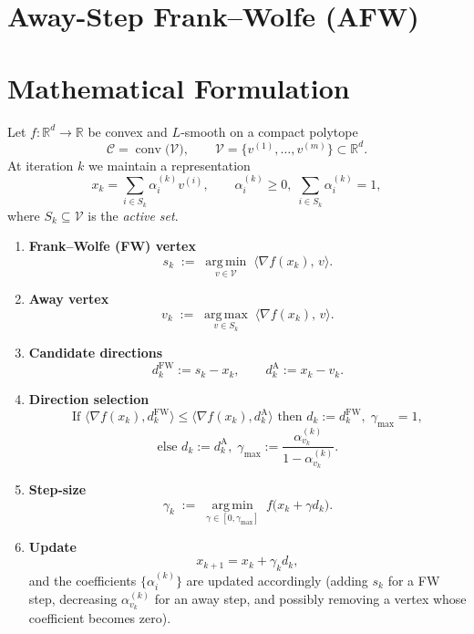 \documentclass{article}
\newcommand{\argmin}{\operatorname*{arg\,min}}
\newcommand{\argmax}{\operatorname*{arg\,max}}
\begin{document}
\section*{Away-Step Frank–Wolfe (AFW)}

\section*{Mathematical Formulation}
Let $f:\mathbb{R}^d\rightarrow\mathbb{R}$ be convex and $L$‑smooth on a compact polytope 
\[
\mathcal C=\operatorname{conv}\bigl(\mathcal V\bigr),\qquad 
\mathcal V=\{v^{(1)},\dots ,v^{(m)}\}\subset\mathbb R^{d}.
\]
At iteration $k$ we maintain a representation 
\[
x_k=\sum_{i\in S_k}\alpha_i^{(k)} v^{(i)},\qquad 
\alpha_i^{(k)}\ge 0,\;\sum_{i\in S_k}\alpha_i^{(k)}=1,
\]
where $S_k\subseteq \mathcal V$ is the \emph{active set}.  

\begin{enumerate}
\item \textbf{Frank–Wolfe (FW) vertex}
\[
s_k\;:=\;\argmin_{v\in\mathcal V}\;\langle\nabla f(x_k),\,v\rangle .
\]
\item \textbf{Away vertex}
\[
v_k\;:=\;\argmax_{v\in S_k}\;\langle\nabla f(x_k),\,v\rangle .
\]
\item \textbf{Candidate directions}
\[
d^{\mathrm{FW}}_k := s_k-x_k,\qquad 
d^{\mathrm{A}}_k := x_k- v_k .
\]
\item \textbf{Direction selection}
\[
\text{If }\langle\nabla f(x_k),d^{\mathrm{FW}}_k\rangle\le 
\langle\nabla f(x_k),d^{\mathrm{A}}_k\rangle
\text{ then }d_k:=d^{\mathrm{FW}}_k,\;\gamma_{\max}=1,
\]
\[
\text{else }d_k:=d^{\mathrm{A}}_k,\;
\gamma_{\max}:=\frac{\alpha_{v_k}^{(k)}}{1-\alpha_{v_k}^{(k)}} .
\]
\item \textbf{Step‑size}
\[
\gamma_k\;:=\;\argmin_{\gamma\in[0,\gamma_{\max}]}
\;f\bigl(x_k+\gamma d_k\bigr).
\]
\item \textbf{Update}
\[
x_{k+1}=x_k+\gamma_k d_k,
\]
and the coefficients $\{\alpha_i^{(k)}\}$ are updated accordingly
(adding $s_k$ for a FW step, decreasing $\alpha_{v_k}^{(k)}$ for an away step,
and possibly removing a vertex whose coefficient becomes zero).
\end{enumerate}
\end{document}
